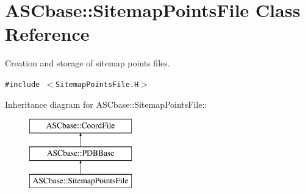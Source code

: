 \section{ASCbase::Sitemap\-Points\-File Class Reference}
\label{classASCbase_1_1SitemapPointsFile}
Creation and storage of sitemap points files.  


{\tt \#include $<$Sitemap\-Points\-File.H$>$}

Inheritance diagram for ASCbase::Sitemap\-Points\-File::\begin{figure}[H]
\begin{center}
\leavevmode
\includegraphics[height=3cm]{classASCbase_1_1SitemapPointsFile}
\end{center}
\end{figure}
